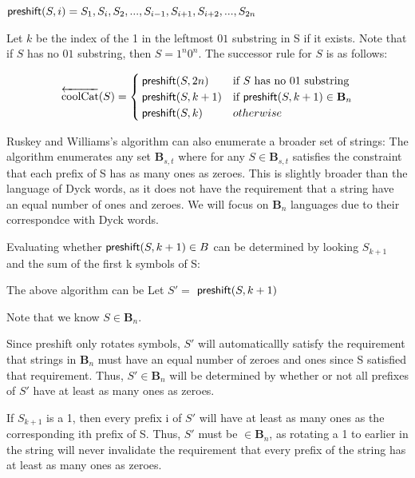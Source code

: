 \noindent $\mathsf{preshift(} S, i \mathsf{)}=S_1,S_i,S_2,...,S_{i-1},S_{i+1},S_{i+2},...,S_{2n}$


\noindent Let $k$ be the index of the 1 in the leftmost $01$ substring in S if it exists. Note that if $S$ has no $01$ substring, then $S=1^n0^n$.  The successor rule for $S$ is as follows:


\begin{equation*}
    \overleftarrow{\text{coolCat}}(S) = \begin{cases}
	\mathsf{preshift(} S, 2n \mathsf{)} & \text{if $S$ has no $01$ substring}\\
	\mathsf{preshift(} S, k+1 \mathsf{)} & \text{if } \mathsf{preshift(} S, k+1 \mathsf{)} \in \mathbf{B}_n\\
	\mathsf{preshift(} S, k \mathsf{)} & otherwise \\
\end{cases}
\end{equation*}

Ruskey and Williams's algorithm can also enumerate a broader set of strings: The algorithm enumerates any set $\mathbf{B}_{s,t}$ where for any $S \in \mathbf{B}_{s,t}$ satisfies the constraint that each prefix of S has as many ones as zeroes.  This is slightly broader than the language of Dyck words, as it does not have the requirement that a string have an equal number of ones and zeroes.
We will focus on $\mathbf{B}_n$  languages due to their correspondce with Dyck words.

Evaluating whether $\mathsf{preshift(} S, k+1 \mathsf{)} \in B$ can be determined by looking $S_{k+1}$ and the sum of the first k symbols of S:  

The above algorithm can be 
Let $S'=$ $\mathsf{preshift(} S, k+1 \mathsf{)}$

Note that we know $S \in \mathbf{B}_n$.  

Since preshift only rotates symbols, $S'$ will automaticallly satisfy the requirement that strings in $\mathbf{B}_n$ must have an equal number of zeroes and ones since S satisfied that requirement. Thus, $S' \in \mathbf{B}_n$ will be determined by whether or not all prefixes of $S'$ have at least as many ones as zeroes.  

If $S_{k+1}$ is a 1, then  every prefix i of $S'$ will have at least as many ones as the corresponding ith prefix of S.  Thus, $S'$ must be $\in \mathbf{B}_n$, as rotating a 1 to earlier in the string will never invalidate the requirement that every prefix of the string has at least as many ones as zeroes.  

